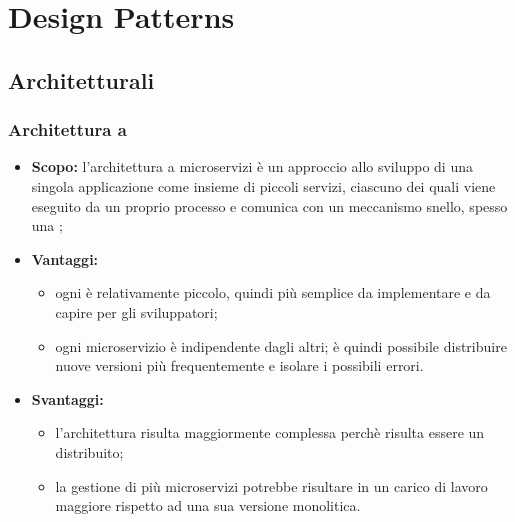 \section{Design Patterns}
  \subsection{Architetturali}
    \subsubsection{Architettura a }
      \begin{itemize}
       \item \textbf{Scopo:} l'architettura a microservizi è un approccio allo sviluppo di una singola applicazione come insieme di piccoli servizi, ciascuno dei quali viene eseguito da un proprio processo e comunica con un meccanismo snello, spesso una  ;
       \item \textbf{Vantaggi:}
	      \begin{itemize} 
	       \item ogni  è relativamente piccolo, quindi più semplice da implementare e da capire per gli sviluppatori;
	       \item ogni microservizio è indipendente dagli altri; è quindi possibile distribuire nuove versioni più frequentemente e isolare i possibili errori.
	      \end{itemize}

       \item \textbf{Svantaggi:}
	\begin{itemize}
	 \item l'architettura risulta maggiormente complessa perchè risulta essere un  distribuito;
	 \item la gestione di più microservizi potrebbe risultare in un carico di lavoro maggiore rispetto ad una sua versione monolitica.
	\end{itemize}
      \end{itemize}
